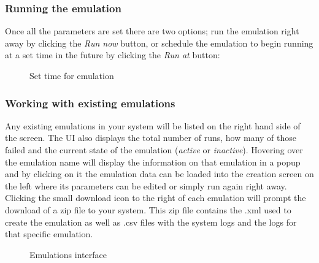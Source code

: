 \documentclass[letterpaper,10pt,english]{sphinxhowto}
\begin{document}
\subsubsection{Running the emulation}
\label{COCOMA/07_webUI:running-the-emulation}
Once all the parameters are set there are two options; run the emulation right away by clicking the \emph{Run now} button, or schedule the emulation to begin running at a set time in the future by clicking the \emph{Run at} button:
\begin{figure}[htbp]
\centering
\capstart

\caption{Set time for emulation}\end{figure}


\subsubsection{Working with existing emulations}
\label{COCOMA/07_webUI:working-with-existing-emulations}
Any existing emulations in your system will be listed on the right hand side of the screen. The UI also displays the total number of runs, how many of those failed and the current state of the emulation (\emph{active} or \emph{inactive}). Hovering over the emulation name will display the information on that emulation in a popup and by clicking on it the emulation data
can be loaded into the creation screen on the left where its parameters can be edited or simply run again right away. Clicking the small download icon to the right of each emulation will prompt the download of a zip file to your system. This zip file contains the .xml used to create the emulation as well as .csv files with the system logs and the logs for that specific emulation.
\begin{figure}[htbp]
\centering
\capstart

\caption{Emulations interface}\end{figure}
\end{document}
